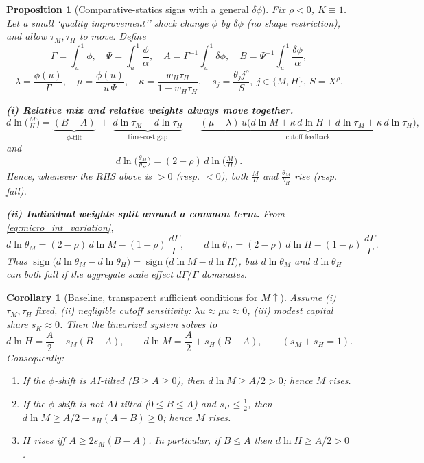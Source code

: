 \documentclass[english]{article}
\newtheorem{proposition}{Proposition}
\newtheorem{corollary}{Corollary}
\begin{document}
\newpage



\begin{proposition}[Comparative-statics signs with a general $\delta\phi$]\label{prop:signs}
Fix $\rho<0$, $K\equiv1$. Let a small `quality improvement'' shock change $\phi$ by $\delta\phi$ (no shape restriction), and allow $\tau_M,\tau_H$ to move. Define
\[
\Gamma=\textstyle\int_u^1\phi,\quad \Psi=\int_u^1\frac{\phi}{\bar\alpha},\quad
A=\Gamma^{-1}\!\int_u^1\delta\phi,\quad B=\Psi^{-1}\!\int_u^1\frac{\delta\phi}{\bar\alpha},
\]
\[
\lambda=\frac{\phi(u)}{\Gamma},\quad \mu=\frac{\phi(u)}{u\,\Psi},\quad
\kappa=\frac{w_H\tau_H}{1-w_H\tau_H},\quad s_j=\frac{\theta_j j^\rho}{S},\ j\in\{M,H\},\ S=X^\rho.
\]

\smallskip
\noindent\textbf{(i) Relative mix and relative weights always move together.}
\[
\boxed{
d\ln\!\Big(\tfrac{M}{H}\Big)
=\underbrace{(B-A)}_{\text{$\phi$-tilt}}
\;+\;\underbrace{d\ln\tau_M-d\ln\tau_H}_{\text{time-cost gap}}
\;-\;\underbrace{(\mu-\lambda)\,u\Big(d\ln M+\kappa\,d\ln H+d\ln\tau_M+\kappa\,d\ln\tau_H\Big)}_{\text{cutoff feedback}},
}
\]
and
\[
\boxed{\ d\ln\!\Big(\tfrac{\theta_M}{\theta_H}\Big)=(2-\rho)\,d\ln\!\Big(\tfrac{M}{H}\Big)\ .\ }
\]
Hence, whenever the RHS above is $>0$ (resp. $<0$), both $\frac{M}{H}$ and $\frac{\theta_M}{\theta_H}$ rise (resp. fall).

\smallskip
\noindent\textbf{(ii) Individual weights split around a common term.}
From \eqref{eq:micro_int_variation},
\[
d\ln\theta_M=(2-\rho)\,d\ln M-(1-\rho)\,\frac{d\Gamma}{\Gamma},\qquad
d\ln\theta_H=(2-\rho)\,d\ln H-(1-\rho)\,\frac{d\Gamma}{\Gamma}.
\]
Thus $\operatorname{sign}\big(d\ln\theta_M-d\ln\theta_H\big)=\operatorname{sign}\big(d\ln M-d\ln H\big)$, but $d\ln\theta_M$ and $d\ln\theta_H$ can \emph{both} fall if the aggregate scale effect $d\Gamma/\Gamma$ dominates.

\end{proposition}

\vspace{1cm}

\begin{corollary}[Baseline, transparent sufficient conditions for $M\uparrow$]\label{cor:Mup}
Assume (i) $\tau_M,\tau_H$ fixed, (ii) negligible cutoff sensitivity: $\lambda u\approx\mu u\approx0$, (iii) modest capital share $s_K\approx0$. Then the linearized system solves to
\[
d\ln H=\frac{A}{2}-s_M(B-A),\qquad
d\ln M=\frac{A}{2}+s_H(B-A),\qquad (s_M+s_H=1).
\]
Consequently:
\begin{enumerate}
\item If the $\phi$-shift is \emph{AI-tilted} ($B\ge A\ge0$), then $d\ln M\ge A/2>0$; hence $M$ rises. 
\item If the $\phi$-shift is \emph{not AI-tilted} ($0\le B\le A$) and $s_H\le\frac12$, then $d\ln M\ge A/2-s_H(A-B)\ge0$; hence $M$ rises.
\item $H$ rises iff $A\ge 2s_M(B-A)$. In particular, if $B\le A$ then $d\ln H\ge A/2>0$.
\end{enumerate}
\end{corollary}
\end{document}
